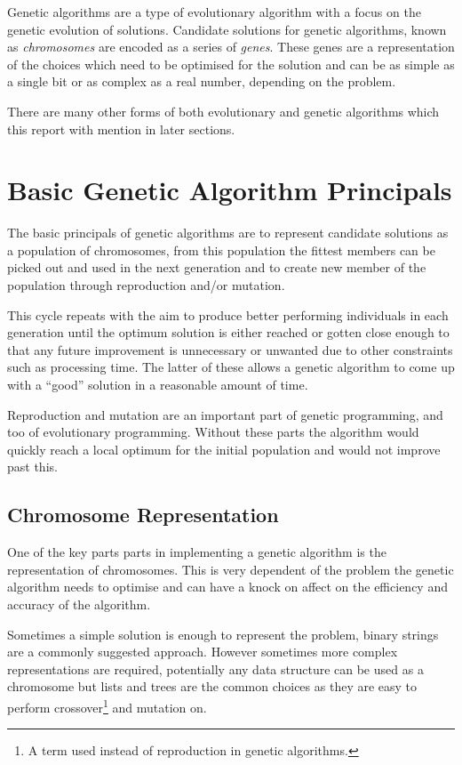 \documentclass[10pt, a4paper]{article}
\begin{document}
Genetic algorithms are a type of evolutionary algorithm with a focus on the 
genetic evolution of solutions. Candidate solutions for genetic algorithms, 
known as \textit{chromosomes} are encoded as a series of \textit{genes}. These
genes are a representation of the choices which need to be optimised for the 
solution and can be as simple as a single bit or as complex as a real number, 
depending on the problem.

There are many other forms of both evolutionary and genetic algorithms which
this report with mention in later sections.


\newpage
\section{Basic Genetic Algorithm Principals}
The basic principals of genetic algorithms are to represent candidate solutions
as a population of chromosomes, from this population the fittest members can be
picked out and used in the next generation and to create new member of the 
population through reproduction and/or mutation.

This cycle repeats with the aim to produce better performing individuals in 
each generation until the optimum solution is either reached or gotten close
enough to that any future improvement is unnecessary or unwanted due to
other constraints such as processing time. The latter of these allows a genetic
algorithm to come up with a ``good'' solution in a reasonable amount of time.

Reproduction and mutation are an important part of genetic programming, and too
of evolutionary programming. Without these parts the algorithm would quickly 
reach a local optimum for the initial population and would not improve past 
this.

\subsection{Chromosome Representation}
One of the key parts parts in implementing a genetic algorithm is the 
representation of chromosomes. This is very dependent of the problem the 
genetic algorithm needs to optimise and can have a knock on affect on the 
efficiency and accuracy of the algorithm.

Sometimes a simple solution is enough to represent the problem, binary strings
are a commonly suggested approach. However sometimes more complex 
representations are required, potentially any data structure can be used as a
chromosome but lists and trees are the common choices as they are easy to 
perform crossover\footnote{A term used instead of reproduction in genetic 
algorithms.} and mutation on.
\end{document}
